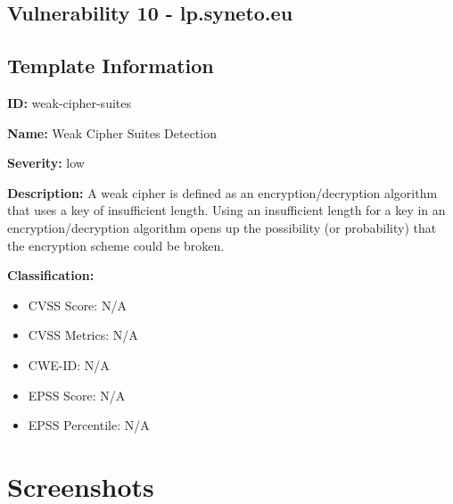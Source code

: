 \section*{Vulnerability 10 - lp.syneto.eu}

\section*{Template Information}
\textbf{ID:} weak-cipher-suites

\textbf{Name:} Weak Cipher Suites Detection

\textbf{Severity:} low

\textbf{Description:} A weak cipher is defined as an encryption/decryption algorithm that uses a key of insufficient length. Using an insufficient length for a key in an encryption/decryption algorithm opens up the possibility (or probability) that the encryption scheme could be broken.

\textbf{Classification:}
\begin{itemize}
\item CVSS Score: N/A
\item CVSS Metrics: N/A
\item CWE-ID: N/A
\item EPSS Score: N/A
\item EPSS Percentile: N/A
\end{itemize}



\chapter{Screenshots}


                                \begin{center}
                                \vspace{0cm}
                                \end{center}
                                
